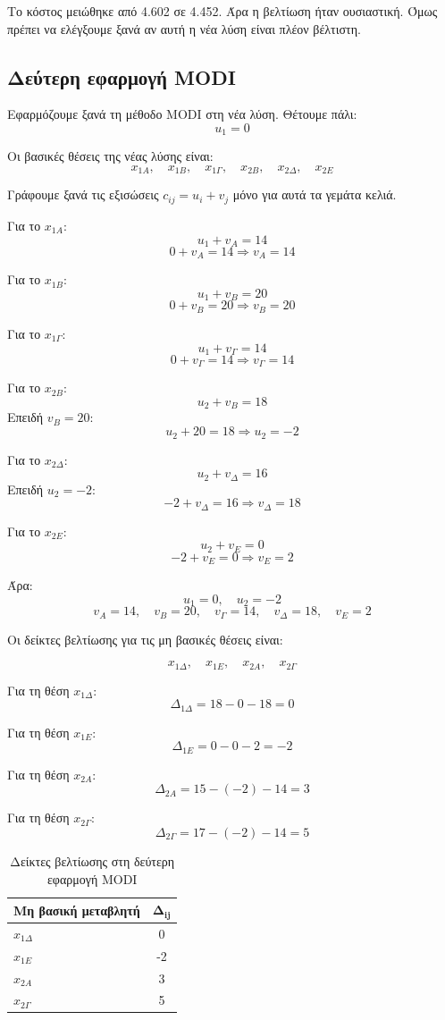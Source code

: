 \documentclass[12pt,a4paper]{article}
\begin{document}
Το κόστος μειώθηκε από 4.602 σε 4.452. Άρα η βελτίωση ήταν ουσιαστική. Όμως πρέπει να ελέγξουμε ξανά αν αυτή η νέα λύση είναι πλέον βέλτιστη.

\subsection{Δεύτερη εφαρμογή MODI}

Εφαρμόζουμε ξανά τη μέθοδο MODI στη νέα λύση. Θέτουμε πάλι:
\[
u_1=0
\]

Οι βασικές θέσεις της νέας λύσης είναι:
\[
x_{1A},\quad x_{1B},\quad x_{1\Gamma},\quad x_{2B},\quad x_{2\Delta},\quad x_{2E}
\]

Γράφουμε ξανά τις εξισώσεις \(c_{ij}=u_i+v_j\) μόνο για αυτά τα γεμάτα κελιά.

Για το \(x_{1A}\):
\[
u_1+v_A=14
\]
\[
0+v_A=14 \Rightarrow v_A=14
\]

Για το \(x_{1B}\):
\[
u_1+v_B=20
\]
\[
0+v_B=20 \Rightarrow v_B=20
\]

Για το \(x_{1\Gamma}\):
\[
u_1+v_\Gamma=14
\]
\[
0+v_\Gamma=14 \Rightarrow v_\Gamma=14
\]

Για το \(x_{2B}\):
\[
u_2+v_B=18
\]
Επειδή \(v_B=20\):
\[
u_2+20=18 \Rightarrow u_2=-2
\]

Για το \(x_{2\Delta}\):
\[
u_2+v_\Delta=16
\]
Επειδή \(u_2=-2\):
\[
-2+v_\Delta=16 \Rightarrow v_\Delta=18
\]

Για το \(x_{2E}\):
\[
u_2+v_E=0
\]
\[
-2+v_E=0 \Rightarrow v_E=2
\]

Άρα:
\[
u_1=0,\quad u_2=-2
\]
\[
v_A=14,\quad v_B=20,\quad v_\Gamma=14,\quad v_\Delta=18,\quad v_E=2
\]

Οι δείκτες βελτίωσης για τις μη βασικές θέσεις είναι:

\[
x_{1\Delta},\quad x_{1E},\quad x_{2A},\quad x_{2\Gamma}
\]

Για τη θέση \(x_{1\Delta}\):
\[
\Delta_{1\Delta}=18-0-18=0
\]

Για τη θέση \(x_{1E}\):
\[
\Delta_{1E}=0-0-2=-2
\]

Για τη θέση \(x_{2A}\):
\[
\Delta_{2A}=15-(-2)-14=3
\]

Για τη θέση \(x_{2\Gamma}\):
\[
\Delta_{2\Gamma}=17-(-2)-14=5
\]

\begin{table}[H]
\centering
\caption{Δείκτες βελτίωσης στη δεύτερη εφαρμογή MODI}
\begin{tabular}{lc}
\toprule
\textbf{Μη βασική μεταβλητή} & \(\boldsymbol{\Delta_{ij}}\) \\
\midrule
\(x_{1\Delta}\) & 0 \\
\(x_{1E}\) & -2 \\
\(x_{2A}\) & 3 \\
\(x_{2\Gamma}\) & 5 \\
\bottomrule
\end{tabular}
\end{table}
\end{document}
